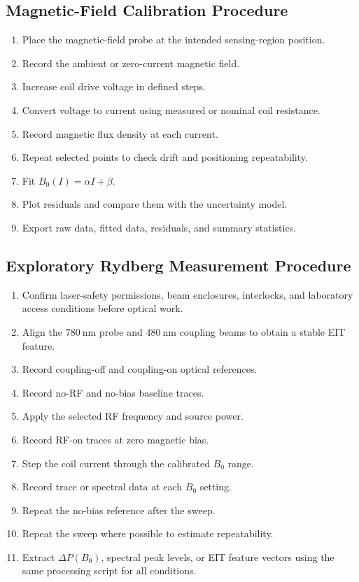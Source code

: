 \documentclass{ieeeaccess}
\begin{document}
\subsection{Magnetic-Field Calibration Procedure}
\label{annex:sop_magnetic}

\begin{enumerate}
    \item Place the magnetic-field probe at the intended sensing-region position.
    \item Record the ambient or zero-current magnetic field.
    \item Increase coil drive voltage in defined steps.
    \item Convert voltage to current using measured or nominal coil resistance.
    \item Record magnetic flux density at each current.
    \item Repeat selected points to check drift and positioning repeatability.
    \item Fit \(B_0(I)=\alpha I+\beta\).
    \item Plot residuals and compare them with the uncertainty model.
    \item Export raw data, fitted data, residuals, and summary statistics.
\end{enumerate}

\subsection{Exploratory Rydberg Measurement Procedure}
\label{annex:sop_rydberg}

\begin{enumerate}
    \item Confirm laser-safety permissions, beam enclosures, interlocks, and laboratory access conditions before optical work.
    \item Align the \(780~\mathrm{nm}\) probe and \(480~\mathrm{nm}\) coupling beams to obtain a stable EIT feature.
    \item Record coupling-off and coupling-on optical references.
    \item Record no-RF and no-bias baseline traces.
    \item Apply the selected RF frequency and source power.
    \item Record RF-on traces at zero magnetic bias.
    \item Step the coil current through the calibrated \(B_0\) range.
    \item Record trace or spectral data at each \(B_0\) setting.
    \item Repeat the no-bias reference after the sweep.
    \item Repeat the sweep where possible to estimate repeatability.
    \item Extract \(\Delta P(B_0)\), spectral peak levels, or EIT feature vectors using the same processing script for all conditions.
\end{enumerate}
\end{document}
